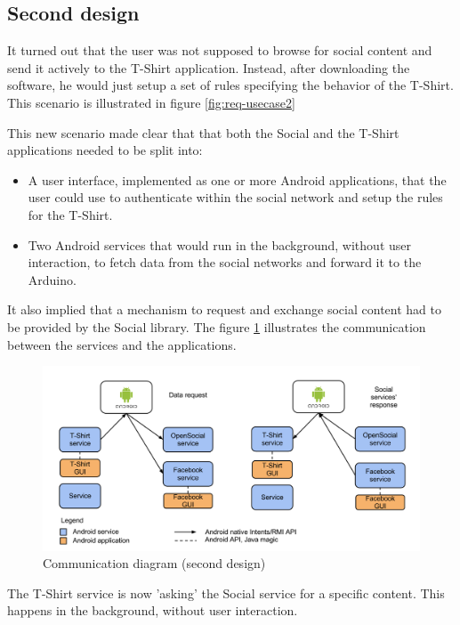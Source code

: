 \subsection{Second design}
It turned out that the user was not supposed to browse for social content and send it actively
to the T-Shirt application. Instead, after downloading the software, he would just setup a set of rules
specifying the behavior of the T-Shirt. This scenario is illustrated in figure \ref{fig:req-usecase2}

This new scenario made clear that that both the Social and the T-Shirt applications needed to
be split into:

\begin{itemize}
\item A user interface, implemented as one or more Android applications, that the user could use to
authenticate within the social network and setup the rules for the T-Shirt.
\item Two Android services that would run in the background, without user interaction,
to fetch data from the social networks and forward it to the Arduino.
\end{itemize}

It also implied that a mechanism to request and exchange social content had to be provided
by the Social library. The figure \ref{fig:design-reqresp} illustrates the communication between
the services and the applications.

\begin{figure}[h!]
\centering \includegraphics[scale=0.35]{img/design-reqresp.png}
\caption{Communication diagram (second design)}
\label{fig:design-reqresp}
\end{figure}

The T-Shirt service is now 'asking' the Social service for a specific content.
This happens in the background, without user interaction.

